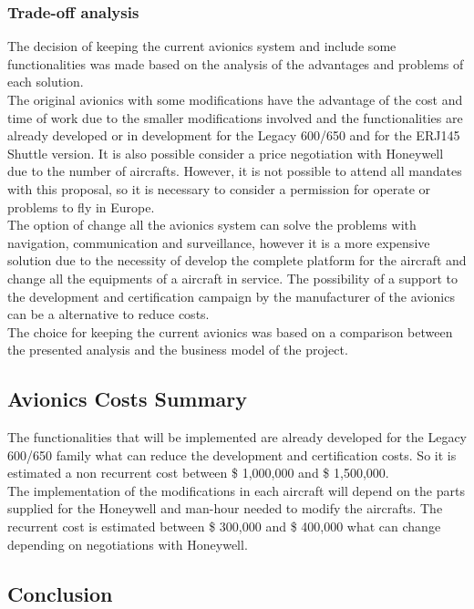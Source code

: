 \subsubsection{Trade-off analysis}
The decision of keeping the current avionics system and include some functionalities was made based on the analysis of the advantages and problems of each solution.
\\The original avionics with some modifications have the advantage of the cost and time of work due to the smaller modifications involved and the functionalities are already developed or in development for the Legacy 600/650 and for the ERJ145 Shuttle version. It is also possible consider a price negotiation with Honeywell due to the number of aircrafts. However, it is not possible to attend all mandates with this proposal, so it is necessary to consider a permission for operate or problems to fly in Europe. 
\\The option of change all the avionics system can solve the problems with navigation, communication and surveillance, however it is a more expensive solution due to the necessity of develop the complete platform for the aircraft and change all the equipments of a aircraft in service. The possibility of a support to the development and certification campaign by the manufacturer of the avionics can be a alternative to reduce costs.
\\The choice for keeping the current avionics was based on a comparison between the presented analysis and the business model of the project.



\subsection{Avionics Costs Summary}
The functionalities that will be implemented are already developed for the Legacy 600/650 family what can reduce the development and certification costs. So it is estimated a non recurrent cost between \$ 1,000,000 and \$ 1,500,000.
\\The implementation of the modifications in each aircraft will depend on the parts supplied for the Honeywell and man-hour needed to modify the aircrafts. The recurrent cost is estimated between \$ 300,000 and \$ 400,000 what can change depending on negotiations with Honeywell.



\subsection{Conclusion}

